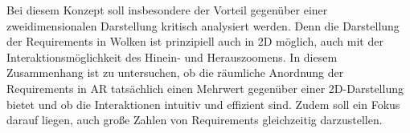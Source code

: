 Bei diesem Konzept soll insbesondere der Vorteil gegenüber einer zweidimensionalen Darstellung kritisch analysiert werden.
Denn die Darstellung der Requirements in Wolken ist prinzipiell auch in 2D möglich, auch mit der Interaktionsmöglichkeit des Hinein- und Herauszoomens.
In diesem Zusammenhang ist zu untersuchen, ob die räumliche Anordnung der Requirements in AR tatsächlich einen Mehrwert gegenüber einer 2D-Darstellung bietet und ob die Interaktionen intuitiv und effizient sind.
Zudem soll ein Fokus darauf liegen, auch große Zahlen von Requirements gleichzeitig darzustellen.

